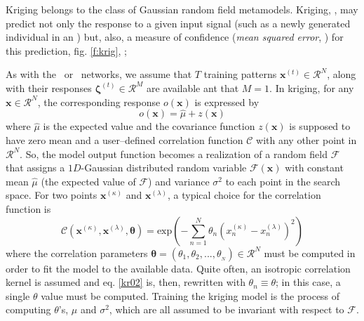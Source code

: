 \documentclass{vki_ls}
\newcommand{\vect}[1]{\bm{#1}}
\newcommand{\set}[1]{\mathcal{#1}}
\begin{document}
Kriging belongs to the class of Gaussian random field metamodels. Kriging, \cite{Kri66}, may predict not only the response to a given input signal (such as a newly generated individual in an \EA) but, also, a measure of confidence (\emph{mean squared error}, \MSE) for this prediction, fig. \ref{f:krig}, \cite{Willmes2003}; 

As with the \MLP\ or \RBF\ networks, we assume that $T$ training patterns $\vect x^{(t)}\!\in\!\set{R}^N$, along with their responses $\vect{\zeta}^{(t)}\!\in\!\set{R}^M$ are available ant that $M\!=\!1$. In kriging, for any $\vect x\!\in\!\set{R}^N$, the corresponding response $o(\vect x)$ is expressed by
%
\begin{equation}
	o(\vect x) = \hat{\mu} + z \left( \vect{x} \right)
	\label{kr01}
\end{equation}
%
where $\hat{\mu}$ is the expected value and the covariance function $z \left( \vect{x} \right)$ is supposed to have zero mean and a user--defined correlation function $\set{C}$ with any other point in $\set{R}^N$.  So, the model output function becomes a realization of a random field $\set{F}$ that assigns a $1D$-Gaussian distributed random variable $\set{F}(\vect x)$ with constant mean $\hat{\mu}$ (the expected value of $\set{F}$) and variance $\sigma^2$ to each point in the search space. For two points $\vect{x}^{(\kappa)}$ and $\vect{x}^{(\lambda)}$, a typical choice for the correlation function is
%
\begin{equation}
  \set{C} \left(\vect{x}^{(\kappa)}, 
		\vect{x}^{(\lambda)},
		\vect{\theta}        \right) =
  \mbox{exp} \left( -\sum_{n=1}^{N} \theta_n
                     \left( x^{(\kappa)}_n - x^{(\lambda)}_n \right) ^2 \right)
\label{kr02}
\end{equation}
%
where the correlation parameters $\vect{\theta}=\left( {\theta_1},{\theta_2},...,{\theta_{_N}} \right) \in \set{R}^N$ must be computed in order to fit the model to the available data. Quite often, an isotropic correlation kernel is assumed and eq. \ref{kr02} is, then, rewritten with $\theta_n\equiv\theta$; in this case, a single $\theta$ value must be computed. Training the kriging model is the process of computing $\theta$'s, $\hat{\mu}$ and $\sigma^2$, which are all assumed to be invariant with respect to $\set{F}$.
\end{document}
